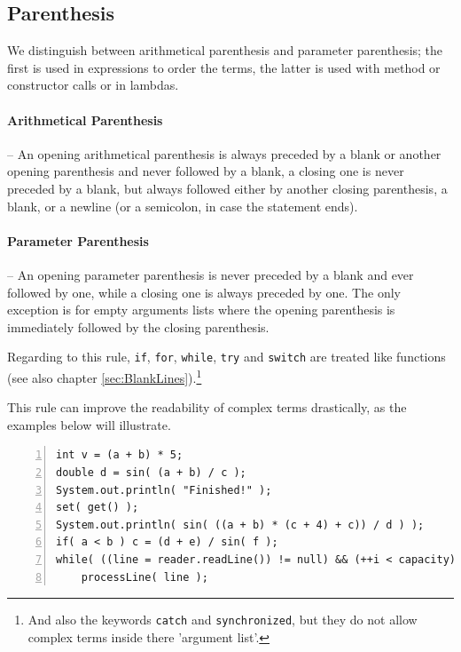 \documentclass[12pt,a4paper,titlepage, parskip=half, headsepline, footsepline, cleardoubleplain]{scrbook}
\begin{document}
\subsection{Parenthesis}\label{sec:Parenthesis}
We distinguish between arithmetical parenthesis and parameter parenthesis; the first is used in expressions to order the terms, the latter is used with method or constructor calls or in lambdas.

\paragraph{Arithmetical Parenthesis}–
An opening arithmetical parenthesis is always preceded by a blank or another opening parenthesis and never followed by a blank, a closing one is never preceded by a blank, but always followed either by another closing parenthesis, a blank, or a newline (or a semicolon, in case the statement ends).

\paragraph{Parameter Parenthesis}\label{sec:ParameterParenthesis}–
An opening parameter parenthesis is never preceded by a blank and ever followed by one, while a closing one is always preceded by one. The only exception is for empty arguments lists where the opening parenthesis is immediately followed by the closing parenthesis.

Regarding to this rule, \lstinline|if|, \lstinline|for|, \lstinline|while|, \lstinline|try| and \lstinline|switch| are treated like functions (see also chapter \ref{sec:BlankLines}).\footnote{And also the keywords \lstinline|catch| and \lstinline|synchronized|, but they do not allow complex terms inside there 'argument list'.}

This rule can improve the readability of complex terms drastically, as the examples below will illustrate.

\begin{lstlisting}[numbers=left]
int v = (a + b) * 5;
double d = sin( (a + b) / c );
System.out.println( "Finished!" );
set( get() );
System.out.println( sin( ((a + b) * (c + 4) + c)) / d ) );
if( a < b ) c = (d + e) / sin( f );
while( ((line = reader.readLine()) != null) && (++i < capacity) )
    processLine( line );
\end{lstlisting}
\end{document}
